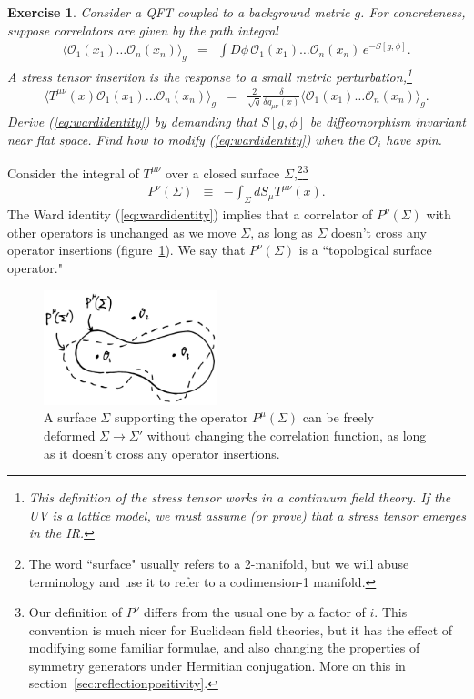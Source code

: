 \documentclass{ws-rv9x6}
\newcommand\be{\begin{eqnarray}}
\newcommand\ee{\end{eqnarray}}
\newcommand\f\phi
\newcommand\cO{\mathcal{O}}
\newcommand\<\langle
\renewcommand\>\rangle
\newcommand\de\delta
\renewcommand\.{\cdot}
\newtheorem{exercise}{Exercise}[section]
\begin{document}
\begin{exercise}
Consider a QFT coupled to a background metric $g$. For concreteness, suppose correlators are given by the path integral
\be
\<\cO_1(x_1)\dots\cO_n(x_n)\>_g &=& \int D\phi\,\cO_1(x_1)\dots\cO_n(x_n)\, e^{-S[g,\f]}.
\ee
A stress tensor insertion is the response to a small metric perturbation,\footnote{This definition  of the stress tensor works in a continuum field theory. If the UV is a lattice model, we must assume (or prove) that a stress tensor emerges in the IR.}
\be
\label{eq:definitionofstresstensor}
\<T^{\mu\nu}(x)\cO_1(x_1)\dots\cO_n(x_n)\>_g &=& \frac{2}{\sqrt g}\frac{\de}{\de g_{\mu\nu}(x)}\<\cO_1(x_1)\dots\cO_n(x_n)\>_g.
\ee
Derive (\ref{eq:wardidentity}) by demanding that $S[g,\phi]$ be diffeomorphism invariant near flat space.  Find how to modify (\ref{eq:wardidentity}) when the $\cO_i$ have spin.
\end{exercise}


Consider the integral of $T^{\mu\nu}$ over a closed surface $\Sigma$,\footnote{The word ``surface" usually refers to a 2-manifold, but we will abuse terminology and use it to refer to a codimension-1 manifold.}\footnote{Our definition of $P^\nu$ differs from the usual one by a factor of $i$.  This convention is much nicer for Euclidean field theories, but it has the effect of modifying some familiar formulae, and also changing the properties of symmetry generators under Hermitian conjugation. More on this in section~\ref{sec:reflectionpositivity}.}
\be
P^\nu(\Sigma) &\equiv& -\int_\Sigma dS_\mu T^{\mu\nu}(x).
\ee
The Ward identity (\ref{eq:wardidentity}) implies that a correlator of $P^\nu(\Sigma)$ with other operators is unchanged as we move $\Sigma$, as long as $\Sigma$ doesn't cross any operator insertions (figure~\ref{fig:topologicalsurfaces}).
We say that $P^\nu(\Sigma)$ is a ``topological surface operator."

\begin{figure}
\begin{center}
\includegraphics[width=0.45\textwidth]{topologicalsurfaces.jpg}
\end{center}
\caption{A surface $\Sigma$ supporting the operator $P^\mu(\Sigma)$ can be freely deformed $\Sigma\to\Sigma'$ without changing the correlation function, as long as it doesn't cross any operator insertions.
\label{fig:topologicalsurfaces} }
\end{figure}
\end{document}
